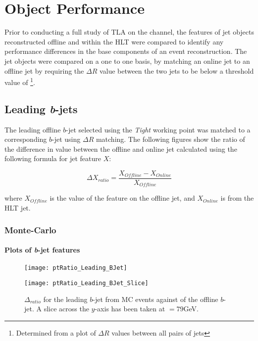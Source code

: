 \chapter{Object Performance}\label{c:OP}

Prior to conducting a full study of TLA on the \VBFHBB channel, the features of jet objects reconstructed offline and within the HLT were compared to identify any performance differences in the base components of an event reconstruction. The jet objects were compared on a one to one basis, by matching an online jet to an offline jet by requiring the $\Delta R$ value between the two jets to be below a threshold value of \DELTARTHRESHOLD\footnote{Determined from a plot of $\Delta R$ values between all pairs of jets}. 

\section{Leading \textit{b}-jets}
\label{OP:leadingb}

	The leading \pt offline $b$-jet selected using the \textit{Tight} working point was matched to a corresponding $b$-jet using $\Delta R$ matching. The following figures show the ratio of the difference in value between the offline and online jet calculated using the following formula for jet feature $X$:

	\begin{equation}
	\Delta X_{ratio} = \frac{X_{Offline} - X_{Online}}{X_{Offline}}
	\end{equation}
	
	where $X_{Offline}$ is the value of the feature on the offline jet, and $X_{Online}$ is from the HLT jet.
	
	\newpage
	\subsection{Monte-Carlo}
	
		\subsubsection{Plots of \textit{b}-jet features}
		
		\begin{figure}[h]
			\centering
			\begin{minipage}[h]{0.33\linewidth}
				\texttt{[image: ptRatio\_Leading\_BJet]}
	
			\end{minipage}
			\quad
			\begin{minipage}[h]{0.33\linewidth}
				\texttt{[image: ptRatio\_Leading\_BJet\_Slice]}
			\end{minipage}
			\caption{$\Delta $\pt$_{ratio}$ for the leading \pt $b$-jet from MC events against \pt of the offline $b$-jet. A slice across the $y$-axis has been taken at \pt$=79$GeV. }
			\label{fig:MC:leadingbpt}
		\end{figure}
		
